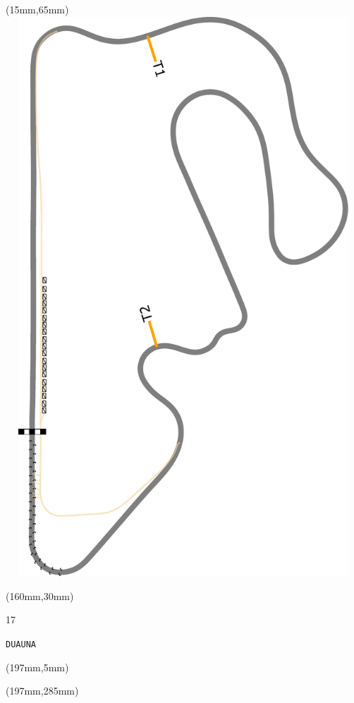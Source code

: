 \begin{textblock*}{185mm}(15mm,65mm)%
\centering
\mbox{\includegraphics[width=185mm,height=210mm,keepaspectratio]{PT/DUAUNA.pdf}}
\end{textblock*}
\begin{textblock*}{40mm}(160mm,30mm)%
\Large
\par{} 
\par17 
\par\hfill\tiny\tt DUAUNA\\
\end{textblock*}
\begin{textblock*}{20mm}(197mm,5mm)%
\fbox{\thepage}
\label{DUAUNA}
\end{textblock*}
\begin{textblock*}{20mm}(197mm,285mm)%
\fbox{\thepage}
\end{textblock*}

